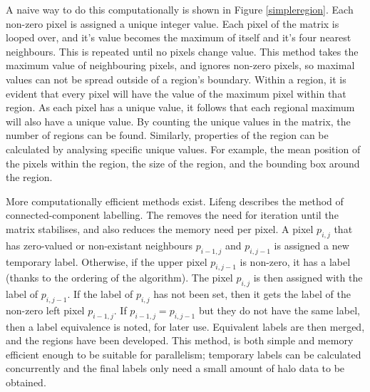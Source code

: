 \documentclass[../main.tex]{subfiles}
\begin{document}
    A naive way to do this computationally is shown in Figure \ref{simpleregion}.
    Each non-zero pixel is assigned a unique integer value.
    Each pixel of the matrix is looped over, and it's value becomes the maximum of itself and it's four nearest neighbours.
    This is repeated until no pixels change value.
    This method takes the maximum value of neighbouring pixels, and ignores non-zero pixels, so maximal values can not be spread outside of a region's boundary.
    Within a region, it is evident that every pixel will have the value of the maximum pixel within that region.
    As each pixel has a unique value, it follows that each regional maximum will also have a unique value.
    By counting the unique values in the matrix, the number of regions can be found.
    Similarly, properties of the region can be calculated by analysing specific unique values.
    For example, the mean position of the pixels within the region, the size of the region, and the bounding box around the region.

    More computationally efficient methods exist.
    Lifeng \cite{efficientregion} describes the method of connected-component labelling.
    The removes the need for iteration until the matrix stabilises, and also reduces the memory need per pixel.
    A pixel $p_{i,j}$ that has zero-valued or non-existant neighbours $p_{i-1,j}$ and $p_{i,j-1}$ is assigned a new temporary label.
    Otherwise, if the upper pixel $p_{i,j-1}$ is non-zero, it has a label (thanks to the ordering of the algorithm).
    The pixel $p_{i,j}$ is then assigned with the label of $p_{i,j-1}$.
    If the label of $p_{i,j}$ has not been set, then it gets the label of the non-zero left pixel $p_{i-1,j}$.
    If $p_{i-1,j} = p_{i,j-1}$ but they do not have the same label, then a label equivalence is noted, for later use.
    Equivalent labels are then merged, and the regions have been developed.
    This method, is both simple and memory efficient enough to be suitable for parallelism; temporary labels can be calculated concurrently and the final labels only need a small amount of halo data to be obtained.
\end{document}
